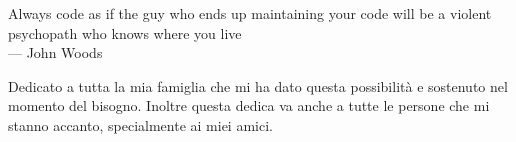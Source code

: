
\cleardoublepage
{}
\thispagestyle{empty}

\vspace*{3cm}

\begin{center}
Always code as if the guy who ends up maintaining your code will be a violent psychopath who knows where you live \\ \medskip
--- John Woods    
\end{center}

\medskip

\begin{center}
Dedicato a tutta la mia famiglia che mi ha dato questa possibilità e sostenuto nel momento del bisogno. Inoltre questa dedica va anche a tutte le persone che mi stanno accanto, specialmente ai miei amici.
\end{center}
